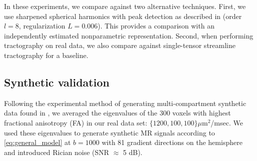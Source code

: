 \documentclass[final,hyperref]{gatech-thesis}
\newcommand{\bn}[1]{\ensuremath{b\!=\!#1}\xspace}
\newcommand{\bone}{\bn{1000}}
\newcommand{\snr}[1]{SNR $\approx$ #1 dB}
\begin{document}
In these experiments, we compare against two alternative techniques.
%
%
First, we use sharpened spherical harmonics with peak detection as described
in \cite{Descoteaux2007} (order $l=8$, regularization $L=0.006$).  This
provides a comparison with an independently estimated nonparametric
representation.
%
Second, when performing tractography on real data, we also compare against
single-tensor streamline tractography for a baseline.


\subsection{Synthetic validation} \label{sec:w_synthetic}

Following the experimental method of generating multi-compartment synthetic
data found in \cite{Tuch2002,Descoteaux2007,Schultz2008}, we averaged the
eigenvalues of the 300 voxels with highest fractional anisotropy (FA) in our
real data set:  $\{1200, 100, 100\}\mu$m$^2$/msec.  We used these eigenvalues
to generate synthetic MR signals according to \autoref{eq:general_model} at
\bone with 81 gradient directions on the hemisphere and introduced Rician
noise (\snr{5}).
\end{document}
